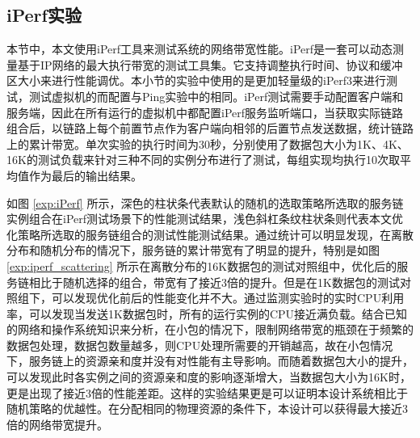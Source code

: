 \subsection{iPerf实验}
本节中，本文使用iPerf工具来测试系统的网络带宽性能。iPerf是一套可以动态测量基于IP网络的最大执行带宽的测试工具集。它支持调整执行时间、协议和缓冲区大小来进行性能调优。本小节的实验中使用的是更加轻量级的iPerf3来进行测试，测试虚拟机的而配置与Ping实验中的相同。iPerf测试需要手动配置客户端和服务端，因此在所有运行的虚拟机中都配置iPerf服务监听端口，当获取实际链路组合后，以链路上每个前置节点作为客户端向相邻的后置节点发送数据，统计链路上的累计带宽。单次实验的执行时间为30秒，分别使用了数据包大小为1K、4K、16K的测试负载来针对三种不同的实例分布进行了测试，每组实现均执行10次取平均值作为最后的输出结果。
\begin{figure}[!htp]
	\centering
\end{figure}
\begin{figure}
	\addtocounter{subfigure}{2}
	\ContinuedFloat
	\centering
\end{figure}

如图 \ref{exp:iPerf} 所示，深色的柱状条代表默认的随机的选取策略所选取的服务链实例组合在iPerf测试场景下的性能测试结果，浅色斜杠条纹柱状条则代表本文优化策略所选取的服务链组合的测试性能测试结果。通过统计可以明显发现，在离散分布和随机分布的情况下，服务链的累计带宽有了明显的提升，特别是如图 \ref{exp:iperf_scattering} 所示在离散分布的16K数据包的测试对照组中，优化后的服务链相比于随机选择的组合，带宽有了接近3倍的提升。但是在1K数据包的测试对照组下，可以发现优化前后的性能变化并不大。通过监测实验时的实时CPU利用率，可以发现当发送1K数据包时，所有的运行实例的CPU接近满负载。结合已知的网络和操作系统知识来分析，在小包的情况下，限制网络带宽的瓶颈在于频繁的数据包处理，数据包数量越多，则CPU处理所需要的开销越高，故在小包情况下，服务链上的资源亲和度并没有对性能有主导影响。而随着数据包大小的提升，可以发现此时各实例之间的资源亲和度的影响逐渐增大，当数据包大小为16K时，更是出现了接近3倍的性能差距。这样的实验结果更是可以证明本设计系统相比于随机策略的优越性。在分配相同的物理资源的条件下，本设计可以获得最大接近3倍的网络带宽提升。

